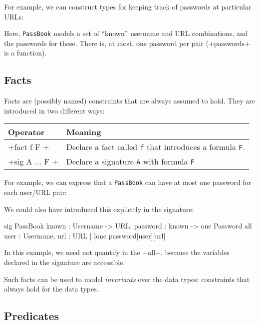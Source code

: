 For example, we can construct types for keeping track of passwords at particular URLs:


Here, \texttt{PassBook} models a set of ``known'' username and URL combinations, and the passwords for these. There is, at most, one password per pair (\A+passwords+ is a function).

\subsection{Facts}

Facts are (possibly named) constraints that are always assumed to hold. They are introduced in two different ways:



\begin{center}
\begin{tabular}{ll}
\toprule
 Operator & Meaning\\
\midrule
 \A+fact f { F }+ & Declare a fact called \texttt{f} that introduces a formula \texttt{F}.\\
 \A+sig A { ... } { F }+ & Declare a signature \texttt{A} with formula \texttt{F}\\
\bottomrule
\end{tabular}
\end{center}

For example, we can express that a \texttt{PassBook} can have at most one password for each user/URL pair:


We could also have introduced this explicitly in the signature:

\begin{alloy}
sig PassBook {known : Username -> URL, password : known -> one Password}
             { all user : Username, url : URL | lone password[user][url]}
\end{alloy}

In this example, we need not quantify  in the \A+all+, because the variables declared in the signature are accessible.

Such facts can be used to model \emph{invariants} over the data types: constraints that always hold for the data types.

\subsection{Predicates}

